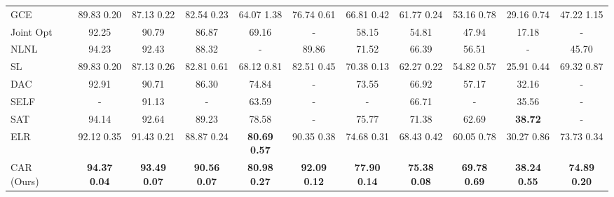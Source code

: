 \documentclass{article}
\begin{document}
\begin{table}
\begin{center}
{\begin{tabular}{ p{25mm} c c c  c c cc c c c c }
				\multirow{1}{*}{GCE \cite{zhang2018generalized}} & &89.83  0.20 &87.13  0.22&82.54  0.23&64.07  1.38&76.74  0.61&66.81  0.42&61.77  0.24&53.16  0.78&29.16  0.74&47.22  1.15\\ \multirow{1}{*}{Joint Opt \cite{tanaka2018joint}} & & 92.25 &90.79&86.87&69.16&-&58.15&54.81&47.94&17.18&-\\
\multirow{1}{*}{NLNL \cite{kim2019nlnl}} & & 94.23 &92.43&88.32&-&89.86&71.52&66.39&56.51&-&45.70\\
\multirow{1}{*}{SL \cite{wang2019symmetric}} & & 89.83  0.20 &87.13  0.26&82.81  0.61&68.12  0.81&82.51  0.45&70.38  0.13&62.27  0.22&54.82  0.57&25.91  0.44&69.32  0.87\\
\multirow{1}{*}{DAC \cite{thulasidasan2019combating}} & & 92.91 &90.71&86.30&74.84&-&73.55&66.92&57.17&32.16&-\\
\multirow{1}{*}{SELF \cite{nguyen2020self}} & & - &91.13&-&63.59&-&-&66.71&-&35.56&-\\
\multirow{1}{*}{SAT \cite{huang2020self}} & & 94.14&92.64&89.23&78.58&-&75.77&71.38&62.69&\textbf{38.72}&-\\
				
				\multirow{1}{*}{ELR \cite{liu2020early}} & & 92.12  0.35&91.43  0.21&88.87  0.24&\textbf{80.69}  \textbf{0.57}&90.35  0.38&74.68  0.31&68.43  0.42&60.05  0.78&30.27  0.86&73.73  0.34\\
\multirow{1}{*}{CAR (Ours)}& &\textbf{94.37}  \textbf{0.04}&\textbf{93.49}  \textbf{0.07}&\textbf{90.56}  \textbf{0.07} &\textbf{80.98}  \textbf{0.27}& \textbf{92.09}  \textbf{0.12}& \textbf{77.90}  \textbf{0.14}&\textbf{75.38}  \textbf{0.08}&\textbf{69.78}  \textbf{0.69}&\textbf{38.24}  \textbf{0.55}&\textbf{74.89}  \textbf{0.20} \\ \bottomrule
				
				
			\end{tabular}
}
	\end{center}
	\label{table:cifar10and100_resnet34}
\end{table}
\end{document}

